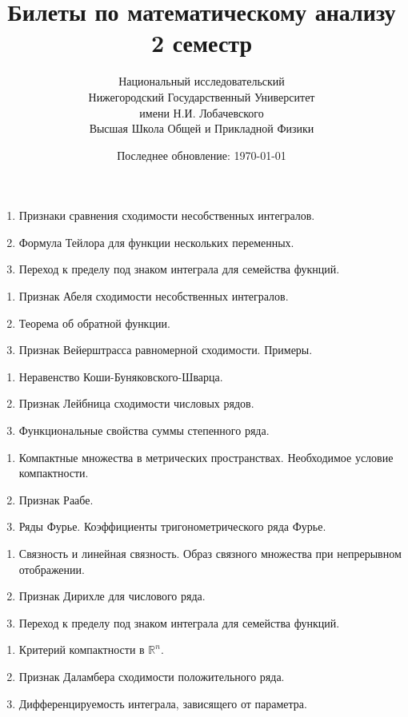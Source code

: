 \documentclass{article}
\title{Билеты по математическому анализу \\ 2 семестр}
\date{Последнее обновление: \today}
\author{Национальный исследовательский \\
Нижегородский Государственный Университет \\
имени Н.И. Лобачевского \vspace{0.5em} \\
Высшая Школа Общей и Прикладной Физики \vspace{0.5em}}
\newcounter{ticket}[subsection]
\newenvironment{ticket}[1][]{\item[Билет \ifthenelse{\equal{#1}{}}{}{\setcounter{ticket}{#1}}\theticket\refstepcounter{ticket}:]\phantom{}\begin{enumerate}}{\end{enumerate}}
\begin{document}
\maketitle
\begin{description}
	\begin{ticket}[1]
		\item Признаки сравнения сходимости несобственных интегралов.
		\item Формула Тейлора для функции нескольких переменных.
		\item Переход к пределу под знаком интеграла для
		      семейства фукнций.
	\end{ticket}
    \begin{ticket}
        \item Признак Абеля сходимости несобственных интегралов.
        \item Теорема об обратной функции.
        \item Признак Вейерштрасса равномерной сходимости. Примеры.
    \end{ticket}
    \begin{ticket}
        \item Неравенство Коши-Буняковского-Шварца.
        \item Признак Лейбница сходимости числовых рядов.
        \item Функциональные свойства суммы степенного ряда.
    \end{ticket}
	\begin{ticket}
		\item Компактные множества в метрических пространствах.
		      Необходимое условие компактности.
		\item Признак Раабе.
		\item Ряды Фурье. Коэффициенты тригонометрического ряда Фурье.
	\end{ticket}
	\begin{ticket}
		\item Связность и линейная связность. Образ связного множества
		      при непрерывном отображении.
		\item Признак Дирихле для числового ряда.
		\item Переход к пределу под знаком интеграла для
		      семейства функций.
	\end{ticket}
	\begin{ticket}
		\item Критерий компактности в $\mathbb{R}^n$.
		\item Признак Даламбера сходимости положительного ряда.
		\item Дифференцируемость интеграла, зависящего от параметра.

\end{ticket}
\end{description}
\end{document}
